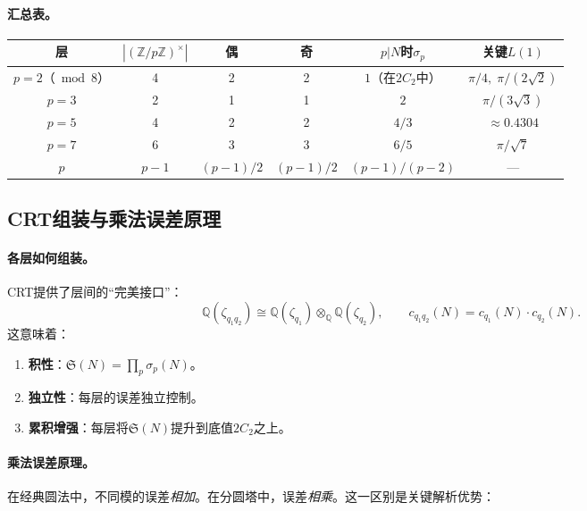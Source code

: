 \documentclass[11pt,a4paper]{article}
\theoremstyle{remark}
\newcommand{\Z}{\mathbb{Z}}
\newcommand{\Q}{\mathbb{Q}}
\begin{document}
\paragraph{汇总表。}
\begin{center}
\begin{tabular}{c|c|c|c|c|c}
层 & $|(\Z/p\Z)^\times|$ & 偶 & 奇 & $p|N$时$\sigma_p$ & 关键$L(1)$ \\
\hline
$p=2$（$\bmod 8$） & 4 & 2 & 2 & $1$（在$2C_2$中） & $\pi/4,\;\pi/(2\sqrt{2})$ \\
$p=3$ & 2 & 1 & 1 & $2$ & $\pi/(3\sqrt{3})$ \\
$p=5$ & 4 & 2 & 2 & $4/3$ & $\approx 0.4304$ \\
$p=7$ & 6 & 3 & 3 & $6/5$ & $\pi/\sqrt{7}$ \\
$p$ & $p-1$ & $(p{-}1)/2$ & $(p{-}1)/2$ & $(p{-}1)/(p{-}2)$ & ---
\end{tabular}
\end{center}

\subsection{CRT组装与乘法误差原理}
\label{subsec:crt-assembly}

\paragraph{各层如何组装。}
CRT提供了层间的``完美接口''：
\begin{equation}
\label{eq:crt-assembly}
  \Q(\zeta_{q_1 q_2}) \cong \Q(\zeta_{q_1}) \otimes_\Q \Q(\zeta_{q_2}),
  \qquad
  c_{q_1 q_2}(N) = c_{q_1}(N) \cdot c_{q_2}(N).
\end{equation}
这意味着：
\begin{enumerate}[nosep]
  \item \textbf{积性}：$\mathfrak{S}(N) = \prod_p \sigma_p(N)$。
  \item \textbf{独立性}：每层的误差独立控制。
  \item \textbf{累积增强}：每层将$\mathfrak{S}(N)$提升到底值$2C_2$之上。
\end{enumerate}

\paragraph{乘法误差原理。}
在经典圆法中，不同模的误差\emph{相加}。在分圆塔中，误差\emph{相乘}。这一区别是关键解析优势：

\medskip
\begin{center}
\end{center}
\medskip
\end{document}
